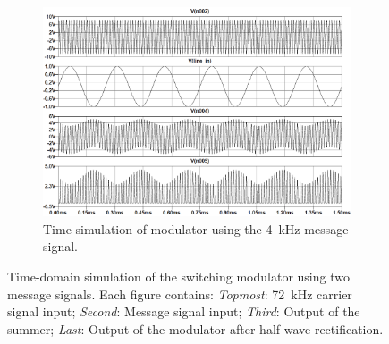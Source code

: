 \documentclass[11pt,letter,notitlepage]{article}
\begin{document}
\begin{figure}[h]
		\begin{subfigure}{0.9\linewidth}
			\centering
			\includegraphics[width=\linewidth]{modulator/modout4kimg}
			\caption{Time simulation of modulator using the \SI{4}{\kHz} message signal.}
			\label{fig:modout4kimg}
		\end{subfigure}
		\caption{Time-domain simulation of the switching modulator using two message signals. Each figure contains: \textit{Topmost}: \SI{72}{\kHz} carrier signal input; \textit{Second}: Message signal input; \textit{Third}: Output of the summer; \textit{Last}: Output of the modulator after half-wave rectification.}
		\label{fig:modouttime}
	\end{figure}
\end{document}
